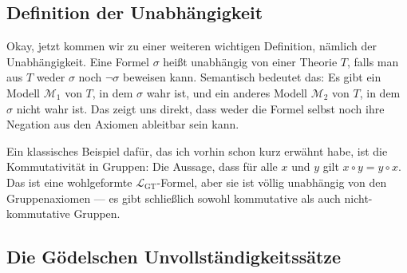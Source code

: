 \subsection{Definition der Unabhängigkeit}

\begin{spoken-clean}[00:57:27 - 00:59:17]
Okay, jetzt kommen wir zu einer weiteren wichtigen Definition, nämlich der Unabhängigkeit. Eine Formel $\sigma$ heißt unabhängig von einer Theorie $T$, falls man aus $T$ weder $\sigma$ noch $\neg\sigma$ beweisen kann. Semantisch bedeutet das: Es gibt ein Modell $\mathcal{M}_1$ von $T$, in dem $\sigma$ wahr ist, und ein anderes Modell $\mathcal{M}_2$ von $T$, in dem $\sigma$ nicht wahr ist. Das zeigt uns direkt, dass weder die Formel selbst noch ihre Negation aus den Axiomen ableitbar sein kann.

Ein klassisches Beispiel dafür, das ich vorhin schon kurz erwähnt habe, ist die Kommutativität in Gruppen: Die Aussage, dass für alle $x$ und $y$ gilt $x \circ y = y \circ x$. Das ist eine wohlgeformte $\mathcal{L}_{\text{GT}}$-Formel, aber sie ist völlig unabhängig von den Gruppenaxiomen --- es gibt schließlich sowohl kommutative als auch nicht-kommutative Gruppen.
\end{spoken-clean}

\begin{math-stroke}

\end{math-stroke}

\subsection{Die Gödelschen Unvollständigkeitssätze}

